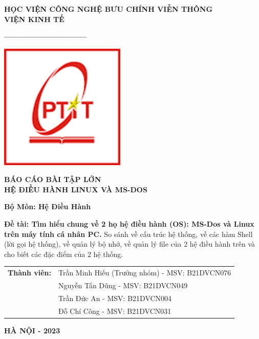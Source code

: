\documentclass[12pt,a4paper]{article}
\begin{document}
\begin{titlepage}
	\begin{tcolorbox}[colback=white, colframe=black, width=\textwidth, height=\textheight,  boxsep=1em]
		\centering
		\vspace*{0.2cm}
		{\fontsize{15}{0} \textbf{HỌC VIỆN CÔNG NGHỆ BƯU CHÍNH VIỄN THÔNG\\VIỆN KINH TẾ}}
		
		\vspace{0.01cm}
		{\fontsize{15}{14} \textbf{------------------------------}}
		\vspace{0.8cm}
	
		\includegraphics[width=6cm]{img/logo.png} 
		
		\vspace{1cm}
			{\fontsize{18}{14} \textbf{BÁO CÁO BÀI TẬP LỚN\\HỆ ĐIỀU HÀNH LINUX VÀ MS-DOS}}
		
		\vspace{0.2cm}
		{\fontsize{18}{14} \textbf{Bộ Môn: Hệ Điều Hành}}
		
		\vspace{0.2cm}
		{\fontsize{11}{14} \textbf{Đề tài: Tìm hiểu chung về 2 họ hệ điều hành (OS): MS-Dos và Linux trên máy tính cá nhân PC.}}
		{\fontsize{11}{14} So sánh về cấu trúc hệ thống, về các hàm Shell (lời gọi hệ thống), về quản lý bộ nhớ, về quản lý file của 2 hệ điều hành trên và cho biết các đặc điểm của 2 hệ thống.}
		
		
		\vspace{2cm}
		\begin{tabular}{ll}
			{\fontsize{15}{0} \textbf{Thành viên:}} 
			& {\fontsize{14}{14}\selectfont Trần Minh Hiếu (Trưởng nhóm) - MSV: B21DVCN076}\\
			& {\fontsize{14}{14}\selectfont Nguyễn Tấn Dũng - MSV: B21DVCN049} \\
			& {\fontsize{14}{14}\selectfont Trần Đức An - MSV: B21DVCN004} \\
			& {\fontsize{14}{14}\selectfont Đỗ Chí Công - MSV: B21DVCN031} \\
		\end{tabular}
		
		\vspace{4cm}
		{\fontsize{15}{14} \textbf{HÀ NỘI - 2023}}
		
		
	\end{tcolorbox}
\end{titlepage}
\end{document}
